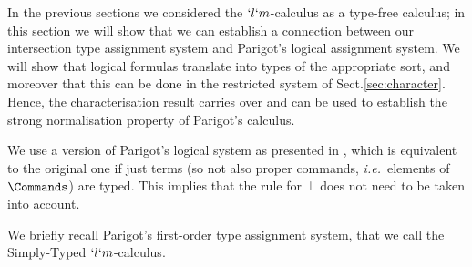 \documentclass{CSML}
\def\ie{\emph{i.e.}}
\begin{document}
In the previous sections we considered the $`l`m$-calculus as a type-free calculus; in this section we will show that we can establish a connection between our intersection type assignment system and Parigot's logical assignment system. 
We will show that logical formulas translate into types of the appropriate sort, and moreover that this can be done in the restricted system of Sect.\skp\ref{sec:character}. 
Hence, the characterisation result carries over and can be used to establish the strong normalisation property of Parigot's calculus.


We use a version of Parigot's logical system as presented in \cite{Parigot'92}, which is equivalent to the original one if just terms (so not also proper commands, \ie~elements of $\Commands$) are typed. This implies that the rule for $\bot$ does not need to be taken into account.%

We briefly recall Parigot's first-order type assignment system, that we call the Simply-Typed $`l`m$-calculus.
\end{document}
